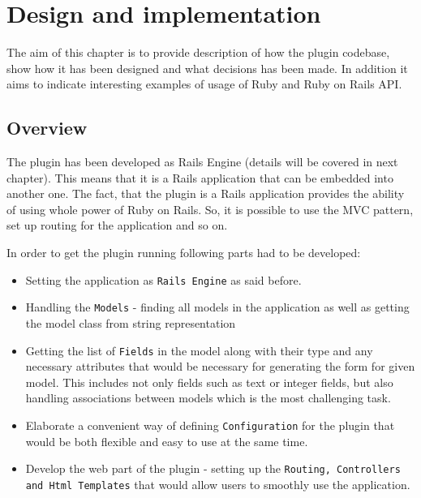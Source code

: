
\nocite{rest}

\chapter{Design and implementation}
  The aim of this chapter is to provide description of how the plugin codebase,
  show how it has been designed and what decisions has been made. In addition it aims to indicate
  interesting examples of usage of Ruby and Ruby on Rails API.
  
  \section{Overview}
    The plugin has been developed as Rails Engine (details will be covered in next chapter). This
    means that it is a Rails application that can be embedded into another one. The fact, that 
    the plugin is a Rails application provides the ability of using whole power of Ruby on Rails.
    So, it is possible to use the MVC pattern, set up routing for the application and so on.
    
    In order to get the plugin running following parts had to be developed:
    \begin{itemize}
      \item Setting the application as \texttt{Rails Engine} as said before.
      \item Handling the \texttt{Models} - finding all models in the application as well as
        getting the model class from string representation
      \item Getting the list of \texttt{Fields} in the model along with their type and any
        necessary attributes that would be necessary for generating the form for given model.
        This includes not only fields such as text or integer fields, but also handling associations
        between models which is the most challenging task.
      \item Elaborate a convenient way of defining \texttt{Configuration} for the plugin that would be both flexible
        and easy to use at the same time.
      \item Develop the web part of the plugin - setting up the \texttt{Routing, Controllers and Html Templates} that 
        would allow users to smoothly use the application.
    \end{itemize}
    
